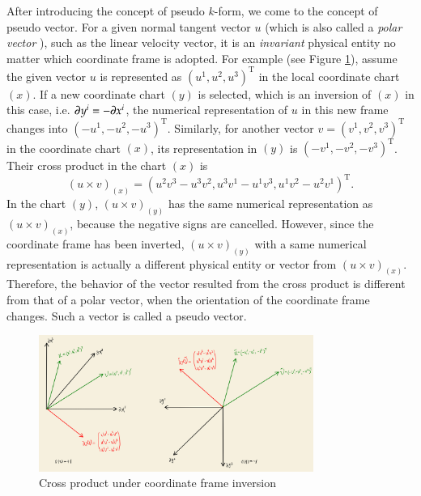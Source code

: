 \documentclass[11pt, a4paper]{book}
\begin{document}
After introducing the concept of pseudo $k$-form, we come to the concept of pseudo vector.
For a given normal tangent vector $u$ (which is also called a \emph{polar vector}
\citep{Pseudovector2023}), such as the linear velocity vector, it is an \emph{invariant}
physical entity no matter which coordinate frame is adopted. For example (see Figure
\ref{fig:cross-product-under-inversion}), assume the given vector $u$ is represented as
$(u^1,u^2,u^3)^{\mathrm{T}}$ in the local coordinate chart $(x)$. If a new coordinate
chart $(y)$ is selected, which is an inversion of $(x)$ in this case, i.e.
$\boldsymbol{\partial}y^i = -\boldsymbol{\partial}x^i$, the numerical representation of $u$ in this new
frame changes into $(-u^1,-u^2,-u^3)^{\mathrm{T}}$. Similarly, for another vector
$v = (v^1,v^2,v^3)^{\mathrm{T}}$ in the coordinate chart $(x)$, its representation in
$(y)$ is $(-v^1,-v^2,-v^3)^{\mathrm{T}}$. Their cross product in the chart $(x)$ is
\begin{equation*}
  (u \times v)_{(x)} = (u^2v^3 - u^3v^2, u^3v^1 - u^1v^3, u^1v^2 - u^2v^1)^{\mathrm{T}}.
\end{equation*}
In the chart $(y)$, $(u \times v)_{(y)}$ has the same numerical representation as
$(u \times v)_{(x)}$, because the negative signs are cancelled. However, since the
coordinate frame has been inverted, $(u \times v)_{(y)}$ with a same numerical
representation is actually a different physical entity or vector from
$(u \times v)_{(x)}$. Therefore, the behavior of the vector resulted from the cross
product is different from that of a polar vector, when the orientation of the coordinate
frame changes. Such a vector is called a pseudo vector.
\begin{figure}[htbp]
  \centering
  \includegraphics[width=0.8\textwidth, height=\textheight, keepaspectratio]{figures/2023-12-27-cross-product-under-coordinate-frame-inversion}
  \caption{Cross product under coordinate frame inversion}
  \label{fig:cross-product-under-inversion}
\end{figure}
\end{document}
